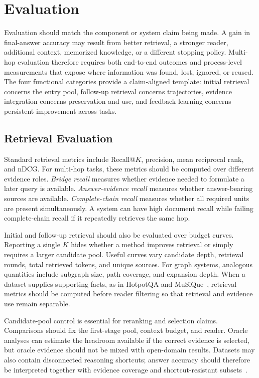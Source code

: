 \section{Evaluation}
\label{sec:evaluation}

Evaluation should match the component or system claim being made. A gain in final-answer accuracy may result from better retrieval, a stronger reader, additional context, memorized knowledge, or a different stopping policy. Multi-hop evaluation therefore requires both end-to-end outcomes and process-level measurements that expose where information was found, lost, ignored, or reused. The four functional categories provide a claim-aligned template: initial retrieval concerns the entry pool, follow-up retrieval concerns trajectories, evidence integration concerns preservation and use, and feedback learning concerns persistent improvement across tasks.

\subsection{Retrieval Evaluation}
\label{subsec:retrieval_evaluation}

Standard retrieval metrics include Recall@$K$, precision, mean reciprocal rank, and nDCG. For multi-hop tasks, these metrics should be computed over different evidence roles. \emph{Bridge recall} measures whether evidence needed to formulate a later query is available. \emph{Answer-evidence recall} measures whether answer-bearing sources are available. \emph{Complete-chain recall} measures whether all required units are present simultaneously. A system can have high document recall while failing complete-chain recall if it repeatedly retrieves the same hop.

Initial and follow-up retrieval should also be evaluated over budget curves. Reporting a single $K$ hides whether a method improves retrieval or simply requires a larger candidate pool. Useful curves vary candidate depth, retrieval rounds, total retrieved tokens, and unique sources. For graph systems, analogous quantities include subgraph size, path coverage, and expansion depth. When a dataset supplies supporting facts, as in HotpotQA and MuSiQue~\cite{yang2018hotpotqa,trivedi2022musique}, retrieval metrics should be computed before reader filtering so that retrieval and evidence use remain separable.

Candidate-pool control is essential for reranking and selection claims. Comparisons should fix the first-stage pool, context budget, and reader. Oracle analyses can estimate the headroom available if the correct evidence is selected, but oracle evidence should not be mixed with open-domain results. Datasets may also contain disconnected reasoning shortcuts; answer accuracy should therefore be interpreted together with evidence coverage and shortcut-resistant subsets~\cite{trivedi2020nohotpot}.

